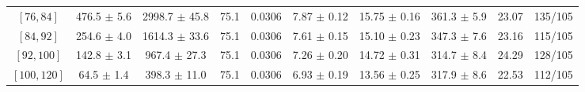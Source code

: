 \begin{tabular}{c||c|c|c|c|c|c|c||c|c}
$[76, 84]$ & 476.5 $\pm$ 5.6 & 2998.7 $\pm$ 45.8 & 75.1 & 0.0306 & 7.87 $\pm$ 0.12 & 15.75 $\pm$ 0.16 & 361.3 $\pm$ 5.9 & 23.07 & 135/105\\
$[84, 92]$ & 254.6 $\pm$ 4.0 & 1614.3 $\pm$ 33.6 & 75.1 & 0.0306 & 7.61 $\pm$ 0.15 & 15.10 $\pm$ 0.23 & 347.3 $\pm$ 7.6 & 23.16 & 115/105\\
$[92, 100]$ & 142.8 $\pm$ 3.1 & 967.4 $\pm$ 27.3 & 75.1 & 0.0306 & 7.26 $\pm$ 0.20 & 14.72 $\pm$ 0.31 & 314.7 $\pm$ 8.4 & 24.29 & 128/105\\
$[100, 120]$ & 64.5 $\pm$ 1.4 & 398.3 $\pm$ 11.0 & 75.1 & 0.0306 & 6.93 $\pm$ 0.19 & 13.56 $\pm$ 0.25 & 317.9 $\pm$ 8.6 & 22.53 & 112/105\\
\end{tabular}

